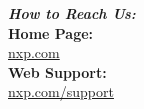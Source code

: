 \begin{flushleft}\textbf{\textsf{\slshape{How to Reach Us\-:}}}\\[6pt]
\textbf{\textsf{Home Page\-:}}\\
\hyperlink{http://www.nxp.com}{nxp.\-com} \\[6pt]
\textbf{\textsf{Web Support\-:}}\\
\hyperlink{http://www.nxp.com/support}{nxp.\-com/support}
\end{flushleft}